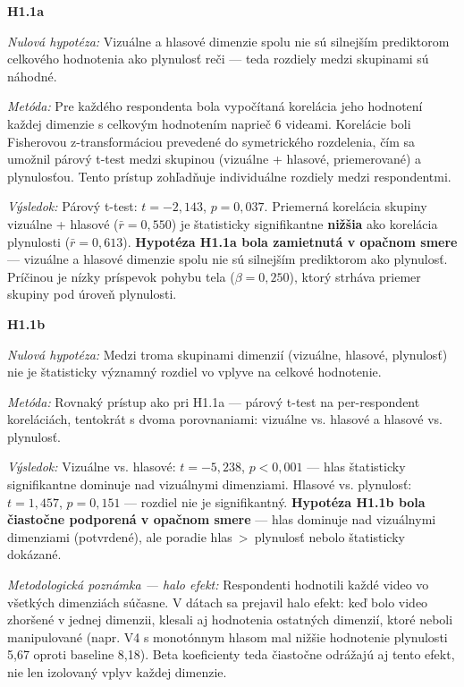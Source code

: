 \textbf{H1.1a}

\textit{Nulová hypotéza:} Vizuálne a hlasové dimenzie spolu nie sú silnejším prediktorom celkového hodnotenia ako plynulosť reči --- teda rozdiely medzi skupinami sú náhodné.

\textit{Metóda:} Pre každého respondenta bola vypočítaná korelácia jeho hodnotení každej dimenzie s celkovým hodnotením naprieč 6 videami. Korelácie boli Fisherovou z-transformáciou prevedené do symetrického rozdelenia, čím sa umožnil párový t-test medzi skupinou (vizuálne + hlasové, priemerované) a plynulosťou. Tento prístup zohľadňuje individuálne rozdiely medzi respondentmi.

\textit{Výsledok:} Párový t-test: $t = -2{,}143$, $p = 0{,}037$. Priemerná korelácia skupiny vizuálne + hlasové ($\bar{r} = 0{,}550$) je štatisticky signifikantne \textbf{nižšia} ako korelácia plynulosti ($\bar{r} = 0{,}613$). \textbf{Hypotéza H1.1a bola zamietnutá v opačnom smere} --- vizuálne a hlasové dimenzie spolu nie sú silnejším prediktorom ako plynulosť.
Príčinou je nízky príspevok pohybu tela ($\beta = 0{,}250$), ktorý strháva priemer skupiny pod úroveň plynulosti.

\textbf{H1.1b}

\textit{Nulová hypotéza:} Medzi troma skupinami dimenzií (vizuálne, hlasové, plynulosť) nie je štatisticky významný rozdiel vo vplyve na celkové hodnotenie.

\textit{Metóda:} Rovnaký prístup ako pri H1.1a --- párový t-test na per-respondent koreláciách, tentokrát s dvoma porovnaniami: vizuálne vs. hlasové a hlasové vs. plynulosť.

\textit{Výsledok:} Vizuálne vs. hlasové: $t = -5{,}238$, $p < 0{,}001$ --- hlas štatisticky signifikantne dominuje nad vizuálnymi dimenziami. Hlasové vs. plynulosť: $t = 1{,}457$, $p = 0{,}151$ --- rozdiel nie je signifikantný. \textbf{Hypotéza H1.1b bola čiastočne podporená v opačnom smere} --- hlas dominuje nad vizuálnymi dimenziami (potvrdené), ale poradie hlas~>~plynulosť nebolo štatisticky dokázané.

\textit{Metodologická poznámka --- halo efekt:} Respondenti hodnotili každé video vo všetkých dimenziách súčasne. V dátach sa prejavil halo efekt: keď bolo video zhoršené v jednej dimenzii, klesali aj hodnotenia ostatných dimenzií, ktoré neboli manipulované (napr. V4 s monotónnym hlasom mal nižšie hodnotenie plynulosti 5,67 oproti baseline 8,18). Beta koeficienty teda čiastočne odrážajú aj tento efekt, nie len izolovaný vplyv každej dimenzie.

